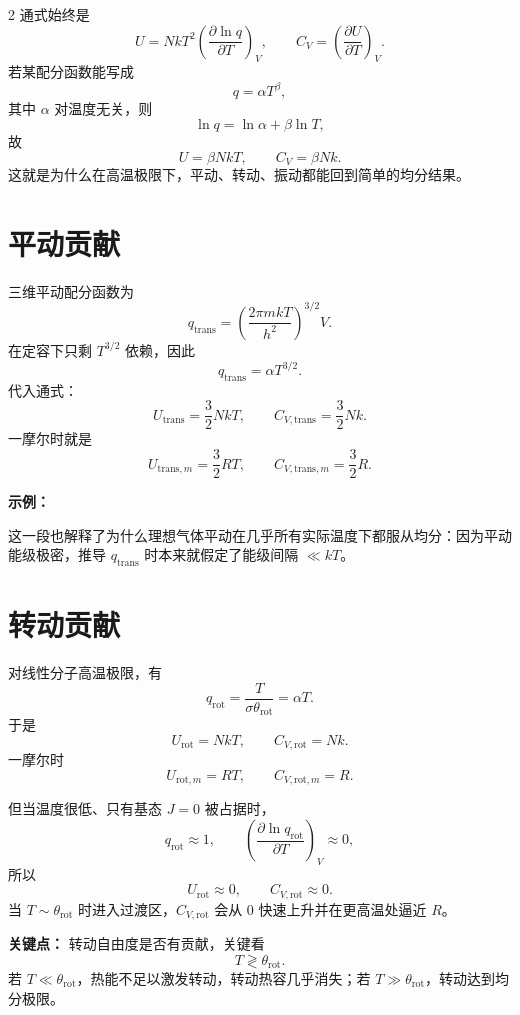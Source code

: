 \documentclass[a4paper,9pt]{article}
\newenvironment{keypoint}
{\par\vspace{0.3em}\noindent\begin{tcolorbox}[colback=keybg,colframe=keycolor,boxrule=0.5pt,arc=2pt,left=2pt,right=2pt,top=2pt,bottom=2pt,boxsep=0pt]\noindent\textcolor{keycolor}{\textbf{关键点：}}}
{\end{tcolorbox}\par\vspace{0.3em}}
\newenvironment{examplebox}
{\par\vspace{0.3em}\noindent\begin{tcolorbox}[colback=boxbg,colframe=derivcolor,boxrule=0.5pt,arc=2pt,left=2pt,right=2pt,top=2pt,bottom=2pt,boxsep=0pt]\scriptsize\noindent\textcolor{derivcolor}{\textbf{示例：}}\par\setlength{\parskip}{0.1ex}\setlength{\itemsep}{0pt}\setlength{\parsep}{0pt}}
{\end{tcolorbox}\par\vspace{0.3em}}
\begin{document}
\begin{multicols}{2}
	通式始终是
	\[
		U=NkT^2\left(\frac{\partial\ln q}{\partial T}\right)_V,
		\qquad
		C_V=\left(\frac{\partial U}{\partial T}\right)_V.
	\]
	若某配分函数能写成
	\[
		q=\alpha T^{\beta},
	\]
	其中 $\alpha$ 对温度无关，则
	\[
		\ln q=\ln\alpha+\beta\ln T,
	\]
	故
	\[
		U=\beta NkT,
		\qquad
		C_V=\beta Nk.
	\]
	这就是为什么在高温极限下，平动、转动、振动都能回到简单的均分结果。

	\section{平动贡献}

	三维平动配分函数为
	\[
		q_{\mathrm{trans}}=\left(\frac{2\pi mkT}{h^2}\right)^{3/2}V.
	\]
	在定容下只剩 $T^{3/2}$ 依赖，因此
	\[
		q_{\mathrm{trans}}=\alpha T^{3/2}.
	\]
	代入通式：
	\[
		U_{\mathrm{trans}}=\frac32NkT,
		\qquad
		C_{V,\mathrm{trans}}=\frac32Nk.
	\]
	一摩尔时就是
	\[
		U_{\mathrm{trans},m}=\frac32RT,
		\qquad
		C_{V,\mathrm{trans},m}=\frac32R.
	\]

	\begin{examplebox}
		这一段也解释了为什么理想气体平动在几乎所有实际温度下都服从均分：因为平动能级极密，推导 $q_{\mathrm{trans}}$ 时本来就假定了能级间隔 $\ll kT$。
	\end{examplebox}

	\section{转动贡献}

	对线性分子高温极限，有
	\[
		q_{\mathrm{rot}}=\frac{T}{\sigma\theta_{\mathrm{rot}}}=\alpha T.
	\]
	于是
	\[
		U_{\mathrm{rot}}=NkT,
		\qquad
		C_{V,\mathrm{rot}}=Nk.
	\]
	一摩尔时
	\[
		U_{\mathrm{rot},m}=RT,
		\qquad
		C_{V,\mathrm{rot},m}=R.
	\]

	但当温度很低、只有基态 $J=0$ 被占据时，
	\[
		q_{\mathrm{rot}}\approx 1,
		\qquad
		\left(\frac{\partial\ln q_{\mathrm{rot}}}{\partial T}\right)_V\approx 0,
	\]
	所以
	\[
		U_{\mathrm{rot}}\approx 0,
		\qquad
		C_{V,\mathrm{rot}}\approx 0.
	\]
	当 $T\sim\theta_{\mathrm{rot}}$ 时进入过渡区，$C_{V,\mathrm{rot}}$ 会从 0 快速上升并在更高温处逼近 $R$。

	\begin{keypoint}
		转动自由度是否有贡献，关键看
		\[
			T\gtrless \theta_{\mathrm{rot}}.
		\]
		若 $T\ll\theta_{\mathrm{rot}}$，热能不足以激发转动，转动热容几乎消失；若 $T\gg\theta_{\mathrm{rot}}$，转动达到均分极限。
	\end{keypoint}


\end{multicols}
\end{document}
